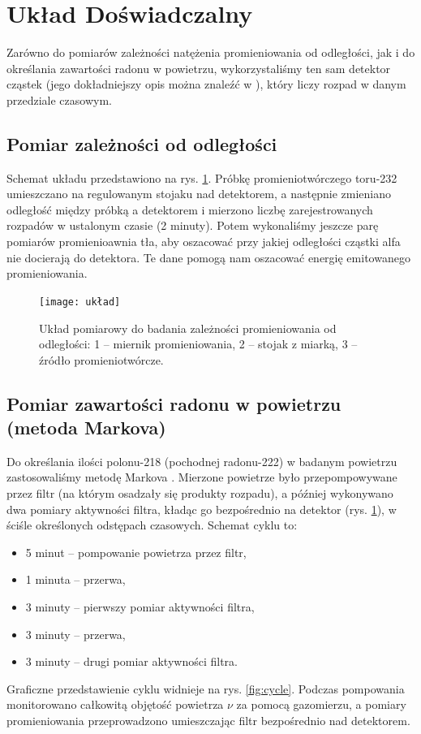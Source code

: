 \documentclass[12pt]{article}
\begin{document}
\section{Układ Doświadczalny}
Zarówno do pomiarów zależności natężenia promieniowania od odległości, jak i do określania zawartości radonu w powietrzu, wykorzystaliśmy ten sam detektor cząstek (jego dokładniejszy opis można znaleźć w \cite{skrypt}), który liczy rozpad w danym przedziale czasowym.

\subsection{Pomiar zależności od odległości}
Schemat układu przedstawiono na rys. \ref{fig:diagram}. Próbkę promieniotwórczego toru-232 umieszczano na regulowanym stojaku nad detektorem, a następnie zmieniano odległość między próbką a detektorem i mierzono liczbę zarejestrowanych rozpadów w ustalonym czasie (2 minuty).
Potem wykonaliśmy jeszcze parę pomiarów promienioawnia tła, aby oszacować przy jakiej odległości cząstki alfa nie docierają do detektora. Te dane pomogą nam oszacować energię emitowanego promieniowania.

\begin{figure}[H]
	\centering
	\texttt{[image: układ]}
	\caption{Układ pomiarowy do badania zależności promieniowania od odległości: 1 – miernik promieniowania, 2 – stojak z miarką, 3 – źródło promieniotwórcze.}
	\label{fig:diagram}
\end{figure}

\subsection{Pomiar zawartości radonu w powietrzu (metoda Markova)}
Do określania ilości polonu-218 (pochodnej radonu-222) w badanym powietrzu zastosowaliśmy metodę Markova \cite{equation}. Mierzone powietrze było przepompowywane przez filtr (na którym osadzały się produkty rozpadu), a później wykonywano dwa pomiary aktywności filtra, kładąc go bezpośrednio na detektor (rys. \ref{fig:diagram}), w ściśle określonych odstępach czasowych. Schemat cyklu to:
\begin{itemize}
	\item 5 minut – pompowanie powietrza przez filtr,
	\item 1 minuta – przerwa,
	\item 3 minuty – pierwszy pomiar aktywności filtra,
	\item 3 minuty – przerwa,
	\item 3 minuty – drugi pomiar aktywności filtra.
\end{itemize}
Graficzne przedstawienie cyklu widnieje na rys. \ref{fig:cycle}. Podczas pompowania monitorowano całkowitą objętość powietrza \(\nu\) za pomocą gazomierzu, a pomiary promieniowania przeprowadzono umieszczając filtr bezpośrednio nad detektorem.
\end{document}
